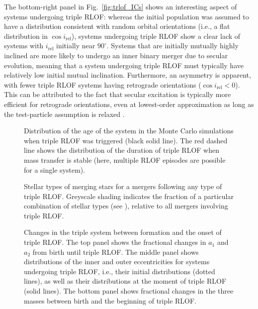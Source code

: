 \documentclass[twocolumn,appendixfloats,tighten]{aastex631}
\newcommand{\F}{Fig.}
\begin{document}
The bottom-right panel in \F~\ref{fig:trlof_ICs} shows an interesting aspect of systems undergoing triple RLOF: whereas the initial population was assumed to have a distribution consistent with random orbital orientations (i.e., a flat distribution in $\cos i_\mathrm{rel}$), systems undergoing triple RLOF show a clear lack of systems with $i_\mathrm{rel}$ initially near $90^\circ$. Systems that are initially mutually highly inclined are more likely to undergo an inner binary merger due to secular evolution, meaning that a system undergoing triple RLOF must typically have relatively low initial mutual inclination. Furthermore, an asymmetry is apparent, with fewer triple RLOF systems having retrograde orientations ($\cos i_\mathrm{rel}<0$). This can be attributed to the fact that secular excitation is typically more efficient for retrograde orientations, even at lowest-order approximation as long as the test-particle assumption is relaxed \citep[e.g.,][]{2021MNRAS.500.3481H}.

\begin{figure}
\iftoggle{ApJFigs}{
\texttt{[image: times]}
}{
\texttt{[image: figs/times]}
}
\caption{Distribution of the age of the system in the Monte Carlo simulations when triple RLOF was triggered (black solid line). The red dashed line shows the distribution of the duration of triple RLOF when mass transfer is stable (here, multiple RLOF episodes are possible for a single system).}
\label{fig:trlof_times}
\end{figure}

\begin{figure}
\iftoggle{ApJFigs}{
\texttt{[image: final\_TRLOF\_merger\_sts]}
}{
\texttt{[image: figs/final\_TRLOF\_merger\_sts]}
}
\caption{Stellar types of merging stars for a mergers following any type of triple RLOF. Greyscale shading indicates the fraction of a particular combination of stellar types (see \citealt{2000MNRAS.315..543H}), relative to all mergers involving triple RLOF. }
\label{fig:trlof_merger_sts}
\end{figure}

\begin{figure}
\iftoggle{ApJFigs}{
\texttt{[image: TRLOF\_a\_changes]}
\texttt{[image: TRLOF\_e\_changes]}
\texttt{[image: TRLOF\_m\_changes]}
}{
\texttt{[image: figs/TRLOF\_a\_changes]}
\texttt{[image: figs/TRLOF\_e\_changes]}
\texttt{[image: figs/TRLOF\_m\_changes]}
}
\caption{Changes in the triple system between formation and the onset of triple RLOF. The top panel shows the fractional changes in $a_1$ and $a_2$ from birth until triple RLOF. The middle panel shows distributions of the inner and outer eccentricities for systems undergoing triple RLOF, i.e., their initial distributions (dotted lines), as well as their distributions at the moment of triple RLOF (solid lines). The bottom panel shows fractional changes in the three masses between birth and the beginning of triple RLOF.  }
\label{fig:trlof_changes}
\end{figure}
\end{document}
